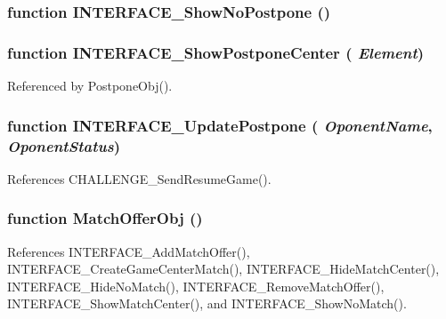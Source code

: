 \subsubsection[INTERFACE\_\-ShowNoPostpone]{\setlength{\rightskip}{0pt plus 5cm}function INTERFACE\_\-ShowNoPostpone ()}\label{interface_2gamecenter_8js_7860dd8d674f065c1ffeb7c43df4c790}


\subsubsection[INTERFACE\_\-ShowPostponeCenter]{\setlength{\rightskip}{0pt plus 5cm}function INTERFACE\_\-ShowPostponeCenter ( {\em Element})}\label{interface_2gamecenter_8js_dd25336da21bb724a3d2b7ed52e6ad9a}




Referenced by PostponeObj().
\subsubsection[INTERFACE\_\-UpdatePostpone]{\setlength{\rightskip}{0pt plus 5cm}function INTERFACE\_\-UpdatePostpone ( {\em OponentName}, \/   {\em OponentStatus})}\label{interface_2gamecenter_8js_336cd2c483da64e645103443b0ef917a}




References CHALLENGE\_\-SendResumeGame().
\subsubsection[MatchOfferObj]{\setlength{\rightskip}{0pt plus 5cm}function MatchOfferObj ()}\label{interface_2gamecenter_8js_896e0593dd0a895f48e3aa20145b9ff5}




References INTERFACE\_\-AddMatchOffer(), INTERFACE\_\-CreateGameCenterMatch(), INTERFACE\_\-HideMatchCenter(), INTERFACE\_\-HideNoMatch(), INTERFACE\_\-RemoveMatchOffer(), INTERFACE\_\-ShowMatchCenter(), and INTERFACE\_\-ShowNoMatch().

